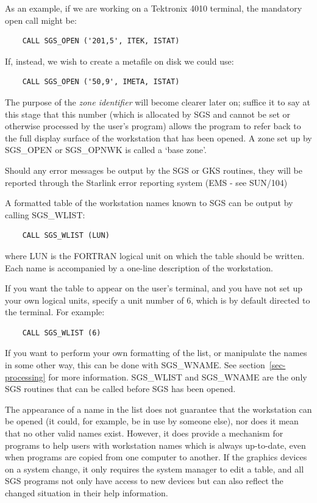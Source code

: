 \documentclass[11pt]{article}
\newcommand{\hyperref}[4]{#2\ref{#4}#3}
\newcommand{\htmlref}[2]{#1}
\newcommand{\xref}[3]{#1}
\begin{document}
As an example, if we are working on a Tektronix 4010 terminal, the mandatory
open call might be:
\begin{verbatim}
    CALL SGS_OPEN ('201,5', ITEK, ISTAT)
\end{verbatim}
If, instead, we wish to create a metafile on disk we could use:
\begin{verbatim}
    CALL SGS_OPEN ('50,9', IMETA, ISTAT)
\end{verbatim}

The purpose of the {\em zone identifier}\/ will become clearer later on; suffice
it to say at this stage that this number (which is allocated by SGS and cannot
be set or otherwise processed by the user's program) allows the program to refer
back to the full display surface of the workstation that has been opened.
A zone set up by SGS\_OPEN or 
\htmlref{SGS\_OPNWK}{SGS_OPNWK} is called a `base zone'.

Should any error messages be output by the SGS or GKS routines, they will be
reported through the Starlink error reporting system (EMS - see
\xref{SUN/104}{sun104}{})

A formatted table of the workstation names known to SGS can be output by
calling \htmlref{SGS\_WLIST}{SGS_WLIST}: 
\begin{verbatim}
    CALL SGS_WLIST (LUN) 
\end{verbatim}
where LUN is the FORTRAN logical unit on which the table should be written.
Each name is accompanied by a one-line description of the workstation.

If you want the table to appear on the user's terminal, and you have not set up
your own logical units, specify a unit number of 6, which is by default directed
to the terminal.
For example:
\begin{verbatim}
    CALL SGS_WLIST (6)
\end{verbatim}
If you want to perform your own formatting of the list, or manipulate the names
in some other way, this can be done with \htmlref{SGS\_WNAME}{SGS_WNAME}.
See \hyperref{this section}{section~}{}{sec-processing}
for more information.
SGS\_WLIST and SGS\_WNAME are the only SGS routines that can be called before
SGS has been opened.

The appearance of a name in the list does not guarantee that the workstation can
be opened (it could, for example, be in use by someone else), nor does it mean
that no other valid names exist.
However, it does provide a mechanism for programs to help users with
workstation names which is always up-to-date, even when programs are copied
from one computer to another.
If the graphics devices on a system change, it only requires the system manager
to edit a table, and all SGS programs not only have access to new
devices but can also reflect the changed situation in their help information.
\end{document}
